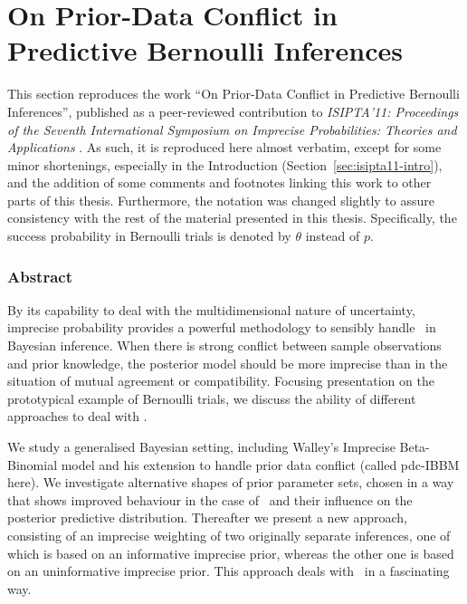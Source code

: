 \section{On Prior-Data Conflict in Predictive Bernoulli Inferences}
\label{sec:isipta11}

This section reproduces the work
``On Prior-Data Conflict in Predictive Bernoulli Inferences'',
published as a peer-reviewed contribution to
\emph{ISIPTA'11: Proceedings of the Seventh International Symposium on
Imprecise Probabilities: Theories and Applications} \parencite{Walter2011a}.
As such, it is reproduced here almost verbatim,
except for some minor shortenings, especially in the Introduction (Section~\ref{sec:isipta11-intro}),
and the addition of some comments and footnotes linking this work to other parts of this thesis.
Furthermore, the notation was changed slightly to assure consistency with the rest of the material presented in this thesis.
Specifically, the success probability in Bernoulli trials is denoted by $\theta$ instead of $p$.

\subsubsection*{Abstract}

By its capability to deal with the multidimensional nature of
uncertainty, imprecise probability provides a powerful methodology
to sensibly handle \pdc\ in Bayesian inference. When there is
strong conflict between sample observations and prior knowledge, the posterior model should be more imprecise
than in the situation of mutual agreement or compatibility. Focusing
presentation on the prototypical example of Bernoulli
trials, we discuss the ability of different approaches to deal with \pdc.

We study a generalised Bayesian setting, including Walley's Imprecise Beta-Binomial model
and his extension to handle prior data conflict (called pdc-IBBM here).
We investigate alternative shapes of prior parameter sets, chosen in a way that shows improved
behaviour in the case of \pdc\ and their influence on the posterior predictive distribution.
Thereafter we present a new approach, consisting of an
imprecise weighting of two originally separate inferences, one of which is based on an informative
imprecise prior, whereas the other one is based on an uninformative imprecise prior. This approach
deals with \pdc\ in a fascinating way.

